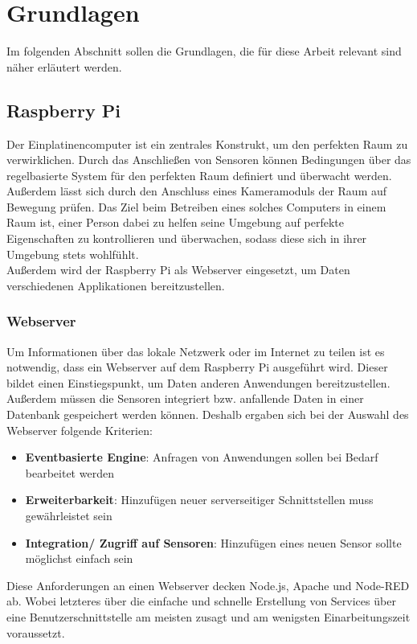 \chapter{Grundlagen}
Im folgenden Abschnitt sollen die Grundlagen, die für diese Arbeit relevant sind näher erläutert werden.

\section{Raspberry Pi} 
Der Einplatinencomputer ist ein zentrales Konstrukt, um den perfekten Raum zu verwirklichen. Durch das Anschließen von Sensoren können Bedingungen über das regelbasierte System für den perfekten Raum definiert und überwacht werden. Außerdem lässt sich durch den Anschluss eines Kameramoduls der Raum auf Bewegung prüfen. Das Ziel beim Betreiben eines solches Computers in einem Raum ist, einer Person dabei zu helfen seine Umgebung auf perfekte Eigenschaften zu kontrollieren und überwachen, sodass diese sich in ihrer Umgebung stets wohlfühlt. 
\\Außerdem wird der Raspberry Pi als Webserver eingesetzt, um Daten verschiedenen Applikationen bereitzustellen. 

\subsection{Webserver}
Um Informationen über das lokale Netzwerk oder im Internet zu teilen ist es notwendig, dass ein Webserver auf dem Raspberry Pi ausgeführt wird\cite{t3n:t3n}. Dieser bildet einen Einstiegspunkt, um Daten anderen Anwendungen bereitzustellen. Außerdem müssen die Sensoren integriert bzw. anfallende Daten in einer Datenbank gespeichert werden können. Deshalb ergaben sich bei der Auswahl des Webserver folgende Kriterien:
\begin{itemize}
	\item \textbf{Eventbasierte Engine}: Anfragen von Anwendungen sollen bei Bedarf bearbeitet werden
	\item \textbf{Erweiterbarkeit}: Hinzufügen neuer serverseitiger Schnittstellen muss gewährleistet sein
	\item \textbf{Integration/ Zugriff auf Sensoren}: Hinzufügen eines neuen Sensor sollte möglichst einfach sein
\end{itemize} 
Diese Anforderungen an einen Webserver decken Node.js, Apache und Node-RED ab. Wobei letzteres über die einfache und schnelle Erstellung von Services über eine Benutzerschnittstelle am meisten zusagt und am wenigsten Einarbeitungszeit voraussetzt.
